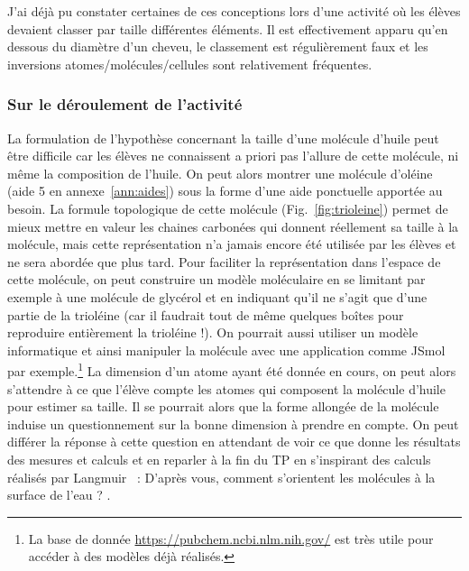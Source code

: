 \documentclass[12pt,a4paper]{article}
\begin{document}
J'ai déjà pu constater certaines de ces conceptions lors d'une activité où les élèves devaient classer par taille différentes éléments.
Il est effectivement apparu qu'en dessous du diamètre d'un cheveu, le classement est régulièrement faux et les inversions atomes/molécules/cellules sont relativement fréquentes.

\subsubsection{Sur le déroulement de l'activité}

La formulation de l'hypothèse concernant la taille d'une molécule d'huile peut être difficile car les élèves ne connaissent a priori pas l'allure de cette molécule, ni même la composition de l'huile.
On peut alors montrer une molécule d'oléine (aide 5 en annexe~\ref{ann:aides}) sous la forme d'une aide ponctuelle apportée au besoin.
La formule topologique de cette molécule (Fig.~\ref{fig:trioleine}) permet de mieux mettre en valeur les chaines carbonées qui donnent réellement sa taille à la molécule, mais cette représentation n'a jamais encore été utilisée par les élèves et ne sera abordée que plus tard.
Pour faciliter la représentation dans l'espace de cette molécule, on peut construire un modèle moléculaire en se limitant par exemple à une molécule de glycérol et en indiquant qu'il ne s'agit que d'une partie de la trioléine (car il faudrait tout de même quelques boîtes pour reproduire entièrement la trioléine !).
On pourrait aussi utiliser un modèle informatique et ainsi \og manipuler \fg{} la molécule avec une application comme JSmol par exemple.\footnote{La base de donnée \href{https://pubchem.ncbi.nlm.nih.gov/}{https://pubchem.ncbi.nlm.nih.gov/} est très utile pour accéder à des modèles déjà réalisés.}
La dimension d'un atome ayant été donnée en cours, on peut alors s'attendre à ce que l'élève compte les atomes qui composent la \og molécule d'huile \fg{} pour estimer sa taille.
Il se pourrait alors que la forme allongée de la molécule induise un questionnement sur la bonne dimension à prendre en compte.
On peut différer la réponse à cette question en attendant de voir ce que donne les résultats des mesures et calculs et en reparler à la fin du TP en s'inspirant des calculs réalisés par Langmuir~\cite{Langmuir1917} : \og D'après vous, comment s'orientent les molécules à la surface de l'eau ? \fg{}.
\end{document}
